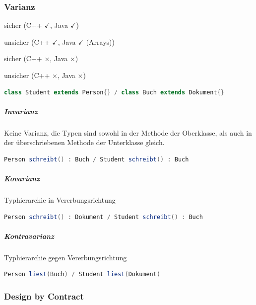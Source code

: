 \documentclass[a4paper,fontsize=9pt, DIV=calc]{scrartcl}
\begin{document}
\begin{multicols}{2}
\subsubsection{Varianz}

\begin{description}\itemsep-2mm
\item[Kovarianter Rückgabetyp] sicher (C++ $\checkmark$, Java $\checkmark$)
\item[Kovarianter Argumenttyp] unsicher (C++ $\checkmark$, Java $\checkmark$ (Arrays))
\item[Kontravarianter Argumenttyp] sicher (C++ $\times$, Java $\times$)
\item[Kontravarianter Rückgabetyp] unsicher (C++ $\times$, Java $\times$)
\end{description}

\begin{lstlisting}[style = siemens, language = Java, caption={}]
class Student extends Person{} / class Buch extends Dokument{}
\end{lstlisting}

\vspace{-2em}
\subparagraph*{Invarianz} Keine Varianz, die Typen sind sowohl in der Methode der Oberklasse, als auch in der überschriebenen Methode der Unterklasse gleich.
\begin{lstlisting}[style = siemens, language = Java, caption={}]
Person schreibt() : Buch / Student schreibt() : Buch
\end{lstlisting}

\vspace{-2em}
\subparagraph*{Kovarianz} Typhierarchie in Vererbungsrichtung
\begin{lstlisting}[style = siemens, language = Java, caption={}]
Person schreibt() : Dokument / Student schreibt() : Buch
\end{lstlisting}

\vspace{-2em}
\subparagraph*{Kontravarianz}Typhierarchie gegen Vererbungsrichtung
\begin{lstlisting}[style = siemens, language = Java, caption={}]
Person liest(Buch) / Student liest(Dokument)
\end{lstlisting}


\subsubsection{Design by Contract}


\end{multicols}
\end{document}
